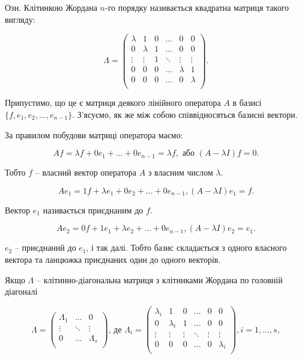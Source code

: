 Озн. Клітинкою Жордана $n$-го порядку називається квадратна матриця
такого вигляду:

$$\Lambda = \begin{pmatrix}
	\lambda & 1 & 0 & ... & 0 & 0 \\
	0 & \lambda & 1 & ... & 0 & 0 \\
	\vdots & \vdots & 1 & \ddots & \vdots & \vdots \\
	0 & 0 & 0 & ...& \lambda & 1 \\
	0 & 0 & 0 & ...& 0 & \lambda \\
\end{pmatrix}. $$

Припустимо, що це є матриця деякого лінійного оператора $A$ в базисі
$\{f, e_1, e_2, ..., e_{n-1}\}$. З’ясуємо, як же між собою співвідносяться базисні вектори.

За правилом побудови матриці оператора маємо:

$$A f = \lambda f + 0 e_1 + ...  + 0 e_{n-1} = \lambda f, \text{ або } (A - \lambda I)f = 0.$$

Тобто $f$ -- власний вектор оператора $A$ з власним числом $\lambda$.

$$A e_1 = 1 f + \lambda e_1 + 0 e_2 + ...  + 0 e_{n-1}, (A - \lambda I)e_1 = f.$$

Вектор $e_1$ називається приєднаним до $f$.

$$A e_2 = 0 f + 1 e_1 + \lambda e_2 + ...  + 0 e_{n-1}, (A - \lambda I)e_2 = e_1.$$


$e_2$ -- приєднаний до $e_1$, і так далі. Тобто базис складається з одного власного
вектора та ланцюжка приєднаних один до одного векторів. 

Якщо $\Lambda$ -- клітинно-діагональна матриця з клітинками Жордана по
головній діагоналі

$$\Lambda = \begin{pmatrix}
	\Lambda_1 & ...    & 0         \\
	\vdots    & \ddots & \vdots    \\
	0         & ...    & \Lambda_s \\
\end{pmatrix} \text{, де } \Lambda_i = \begin{pmatrix}
	\lambda_i & 1         & 0      & ...    & 0      & 0         \\
	0         & \lambda_i & 1      & ...    & 0      & 0         \\
	\vdots    & \vdots    & \vdots & \ddots & \vdots & \vdots    \\
	0         & 0         & 0      & ...    & 0      & \lambda_i \\
\end{pmatrix}, i = 1, ..., s, $$

